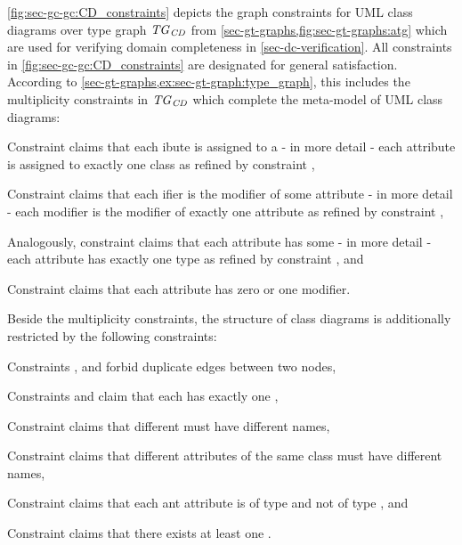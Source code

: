 \begin{example}
\label{ex:sec-gc-gc:gc_UML_CD}
\cref{fig:sec-gc-gc:CD_constraints} depicts the graph constraints for UML class diagrams over type graph $\mathit{TG}_\mathit{CD}$ from \cref{sec-gt-graphs,fig:sec-gt-graphs:atg} which are used for verifying domain completeness in \cref{sec-dc-verification}.
All constraints in \cref{fig:sec-gc-gc:CD_constraints} are designated for general satisfaction.
According to \cref{sec-gt-graphs,ex:sec-gt-graph:type_graph}, this includes the multiplicity constraints in $\mathit{TG}_\mathit{CD}$ which complete the meta-model of UML class diagrams:
\begin{enumerate*}
\item Constraint  claims that each ibute is assigned to a  - in more detail - each attribute is assigned to exactly one class as refined by constraint ,
\item Constraint  claims that each ifier is the modifier of some attribute - in more detail - each modifier is the modifier of exactly one attribute as refined by constraint ,
\item Analogously, constraint  claims that each attribute has some  - in more detail - each attribute has exactly one type as refined by constraint , and
\item Constraint  claims that each attribute has zero or one modifier.
\end{enumerate*}
Beside the multiplicity constraints, the structure of class diagrams is additionally restricted by the following constraints:
\begin{enumerate*}
\item Constraints ,  and  forbid duplicate edges between two nodes,
\item Constraints  and  claim that each  has exactly one ,
\item Constraint  claims that different  must have different names,
\item Constraint  claims that different attributes of the same class must have different names,
\item Constraint  claims that each ant attribute is of type  and not of type , and
\item Constraint  claims that there exists at least one .

\end{enumerate*}
\end{example}
